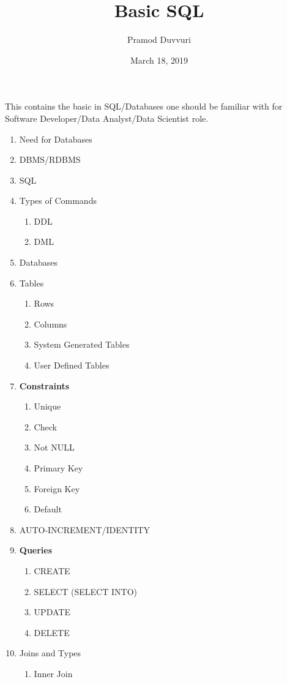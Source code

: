 \documentclass[11pt]{article}
\title{Basic SQL}
\author{Pramod Duvvuri}
\date{March 18, 2019}
\begin{document}
	\maketitle
	This contains the basic in SQL/Databases one should be familiar with for Software Developer/Data Analyst/Data Scientist role. 
	\begin{enumerate}
	\item Need for Databases
	\item DBMS/RDBMS
	\item SQL
	\item Types of Commands
	\begin{enumerate}
		\item DDL
		\item DML
	\end{enumerate}	
    \item Databases 
     \item Tables
     \begin{enumerate}
     	\item Rows
     	\item Columns
     	\item System Generated Tables
     	\item User Defined Tables
     \end{enumerate} 
    \item \textbf{Constraints}
    \begin{enumerate}
    	\item Unique
    	\item Check
    	\item Not NULL
    	\item Primary Key
    	\item Foreign Key
    	\item Default
    \end{enumerate}
    \item AUTO-INCREMENT/IDENTITY
    \item \textbf{Queries}
    \begin{enumerate}
    	\item CREATE
    	\item SELECT (SELECT INTO)
    	\item UPDATE
    	\item DELETE
    \end{enumerate}
   \item Joins and Types
   \begin{enumerate}
   	\item Inner Join

\end{enumerate}
\end{enumerate}
\end{document}
